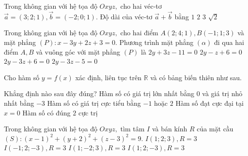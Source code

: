\begin{ex}%
Trong không gian với hệ tọa độ $Oxyz,$ cho hai véc-tơ $\vec{a}=(3;2;1),\vec{b}=(-2;0;1).$ Độ dài của véc-tơ $\vec{a}+\vec{b}$ bằng
\choice
{$1$}
{$2$}
{\True $3$}
{$\sqrt2$}
\end{ex}

\begin{ex}%
Trong không gian với hệ tọa độ $Oxyz,$ cho hai điểm $A(2;4;1),B(-1;1;3)$ và mặt phẳng $(P):x-3y+2z+3=0.$ Phương trình mặt phẳng $(\alpha)$ đi qua hai điểm $A, B$ và vuông góc với mặt phẳng $(P)$ là
\choice
{\True $2y+3z-11=0$}
{$2y-z+6=0$}
{$2y-3z+6=0$}
{$2y-3z-5=0$}
\end{ex}

\begin{ex}%
Cho hàm số $y=f(x)$ xác định, liên tục trên $\mathbb{R}$ và có bảng biến thiên như sau.
\begin{center}
\end{center}
Khẳng định nào sau đây đúng?
\choice
{Hàm số có giá trị lớn nhất bằng $0$ và giá trị nhỏ nhất bằng $-3$}
{Hàm số có giá trị cực tiểu bằng $-1$ hoặc $2$}
{\True Hàm số đạt cực đại tại $x=0$}
{Hàm số có đúng $2$ cực trị}
\end{ex}

\begin{ex}%
Trong không gian với hệ tọa độ $Oxyz,$ tìm tâm $I$ và bán kính $R$ của mặt cầu $(S): (x-1)^2+(y+2)^2+(z-3)^2=9.$
\choice
{$I(1;2;3), R=3$}
{$I(-1;2;-3), R=3$}
{\True $I(1;-2;3), R=3$}
{$I(1;2;-3), R=3$}
\end{ex}

